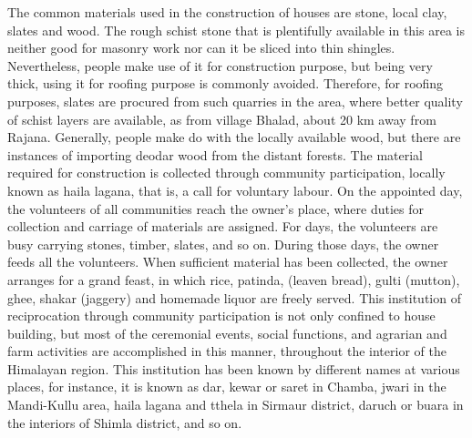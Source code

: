 The common materials used in the construction of houses are stone, local clay, slates and wood. The rough schist stone that is plentifully available in this area is neither good for masonry work nor can it be sliced into thin shingles. Nevertheless, people make use of it for construction purpose, but being very thick, using it for roofing purpose is commonly avoided. Therefore, for roofing purposes, slates are procured from such quarries in the area, where better quality of schist layers are available, as from village Bhalad, about 20 km away from Rajana. Generally, people make do with the locally available wood, but there are instances of importing deodar wood from the distant forests. The material required for construction is collected through community participation, locally known as haila lagana, that is, a call for voluntary labour. On the appointed day, the volunteers of all communities reach the owner’s place, where duties for collection and carriage of materials are assigned. For days, the volunteers are busy carrying stones, timber, slates, and so on. During those days, the owner feeds all the volunteers. When sufficient material has been collected, the owner arranges for a grand feast, in which rice, patinda, (leaven bread), gulti (mutton), ghee, shakar (jaggery) and homemade liquor are freely served. This institution of reciprocation through community participation is not only confined to house building, but most of the ceremonial events, social functions, and agrarian and farm activities are accomplished in this manner, throughout the interior of the Himalayan region. This institution has been known by different names at various places, for instance, it is known as dar, kewar or saret in Chamba, jwari in the Mandi-Kullu area, haila lagana and tthela in Sirmaur district, daruch or buara in the interiors of Shimla district, and so on.


